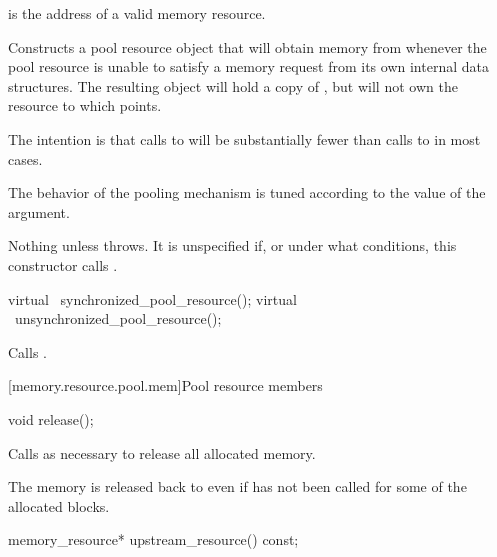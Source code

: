 \begin{itemdescr}
\pnum
\requires
{} is the address of a valid memory resource.

\pnum
\effects
Constructs a pool resource object that will obtain memory from 
whenever the pool resource is unable to satisfy a memory request
from its own internal data structures.
The resulting object will hold a copy of ,
but will not own the resource to which  points.
\begin{note}
The intention is that calls to 
will be substantially fewer than calls to 
in most cases.\end{note}
The behavior of the pooling mechanism is tuned
according to the value of the  argument.

\pnum
\throws
Nothing unless  throws.
It is unspecified if, or under what conditions,
this constructor calls .
\end{itemdescr}

%
%
\begin{itemdecl}
virtual ~synchronized_pool_resource();
virtual ~unsynchronized_pool_resource();
\end{itemdecl}

\begin{itemdescr}
\pnum
\effects
Calls .
\end{itemdescr}

[memory.resource.pool.mem]{Pool resource members}

%
%
\begin{itemdecl}
void release();
\end{itemdecl}

\begin{itemdescr}
\pnum
\effects
Calls  as necessary
to release all allocated memory.
\begin{note}
The memory is released back to 
even if  has not been called
for some of the allocated blocks.\end{note}
\end{itemdescr}

%
%
\begin{itemdecl}
memory_resource* upstream_resource() const;
\end{itemdecl}

